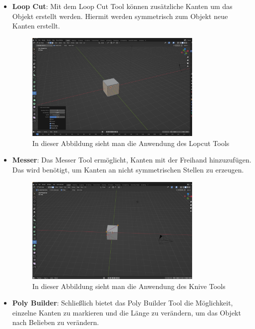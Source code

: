 \begin{itemize}
    \item \textbf{Loop Cut}:
    \indent Mit dem Loop Cut Tool können zusätzliche Kanten um das Objekt erstellt werden. Hiermit werden symmetrisch zum Objekt neue Kanten erstellt.
    \begin{figure}[H]
        \centering
        \includegraphics[width=0.8\textwidth]{chapters/13/images/Loopcut.png}
        \caption{In dieser Abbildung sieht man die Anwendung des Lopcut Tools}
        \label{UST-11}
    \end{figure}
    \item \textbf{Messer}:
    \indent Das Messer Tool ermöglicht, Kanten mit der Freihand hinzuzufügen. Das wird benötigt, um Kanten an nicht symmetrischen Stellen zu erzeugen.
    \begin{figure}[H]
        \centering
        \includegraphics[width=0.8\textwidth]{chapters/13/images/KniveTool.png}
        \caption{In dieser Abbildung sieht man die Anwendung des Knive Tools}
        \label{UST-12}
    \end{figure}
    \item \textbf{Poly Builder}: 
    \indent Schließlich bietet das Poly Builder Tool die Möglichkeit, einzelne Kanten zu markieren und die Länge zu verändern, um das Objekt nach Belieben zu verändern.
    \begin{figure}[H]

\end{figure}
\end{itemize}
